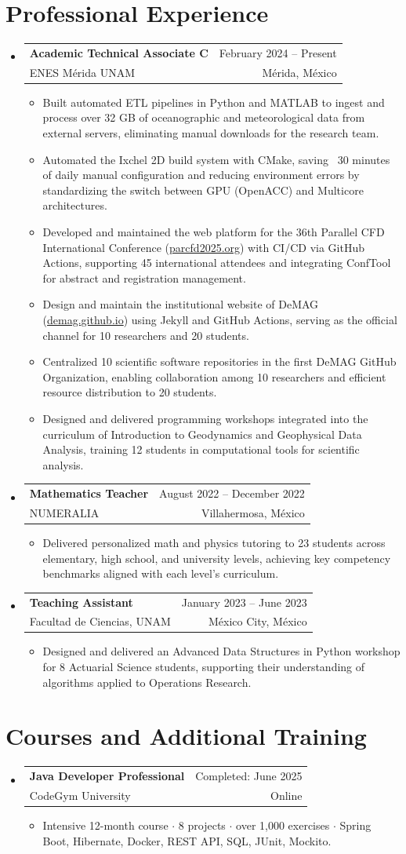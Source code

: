 \documentclass[10pt, letterpaper]{article}
\makeatletter
\newcommand{\CVitem}[1]{
	\item \small{#1}
}
\newcommand{\CVListStart}{\begin{itemize}[leftmargin=0cm, label={}]}
\newcommand{\CVListEnd}{\end{itemize}}
\newcommand{\CVSubHeading}[4]{
	\item \begin{tabular*}{19.5cm}[t]{l@{\extracolsep{\fill}}r}
		\textbf{#1} & #2 \\
		\small #3 & \small #4 \\
	\end{tabular*} \vspace{-4pt}
}
\newcommand{\CVItemizeStart}{\begin{itemize}[rightmargin=1cm, label={\tiny \textbullet}]}
\newcommand{\CVItemizeEnd}{\end{itemize}}
\makeatother
\begin{document}
\section{Professional Experience}
\CVListStart
\CVSubHeading{\small Academic Technical Associate C}{February 2024 -- Present}{ENES Mérida UNAM}{Mérida, México}
\CVItemizeStart
\CVitem{Built automated ETL pipelines in Python and MATLAB to ingest and process over 32 GB of oceanographic and meteorological data from external servers, eliminating manual downloads for the research team.}
\CVitem{Automated the Ixchel 2D build system with CMake, saving ~30 minutes of daily manual configuration and reducing environment errors by standardizing the switch between GPU (OpenACC) and Multicore architectures.}
\CVitem{Developed and maintained the web platform for the 36th Parallel CFD International Conference (\href{https://www.parcfd2025.org/}{parcfd2025.org}) with CI/CD via GitHub Actions, supporting 45 international attendees and integrating ConfTool for abstract and registration management.}
\CVitem{Design and maintain the institutional website of DeMAG (\href{https://enes-merida.github.io/demag.github.io/}{demag.github.io}) using Jekyll and GitHub Actions, serving as the official channel for 10 researchers and 20 students.}
\CVitem{Centralized 10 scientific software repositories in the first DeMAG GitHub Organization, enabling collaboration among 10 researchers and efficient resource distribution to 20 students.}
\CVitem{Designed and delivered programming workshops integrated into the curriculum of Introduction to Geodynamics and Geophysical Data Analysis, training 12 students in computational tools for scientific analysis.}
\CVItemizeEnd

\CVSubHeading{\small Mathematics Teacher}{August 2022 -- December 2022}{NUMERALIA}{Villahermosa, México}
\CVItemizeStart
\CVitem{Delivered personalized math and physics tutoring to 23 students across elementary, high school, and university levels, achieving key competency benchmarks aligned with each level's curriculum.}
\CVItemizeEnd

\CVSubHeading{\small Teaching Assistant}{January 2023 -- June 2023}{Facultad de Ciencias, UNAM}{México City, México}
\CVItemizeStart
\CVitem{Designed and delivered an Advanced Data Structures in Python workshop for 8 Actuarial Science students, supporting their understanding of algorithms applied to Operations Research.}
\CVItemizeEnd

\CVListEnd
\newpage
\section*{Courses and Additional Training}
\CVListStart
\CVSubHeading{Java Developer Professional}{Completed: June 2025}{CodeGym University}{Online}
\CVItemizeStart
\CVitem{Intensive 12-month course $\cdot$ 8 projects $\cdot$ over 1,000 exercises $\cdot$ Spring Boot, Hibernate, Docker, REST API, SQL, JUnit, Mockito.}
\CVItemizeEnd
\CVListEnd
\end{document}
